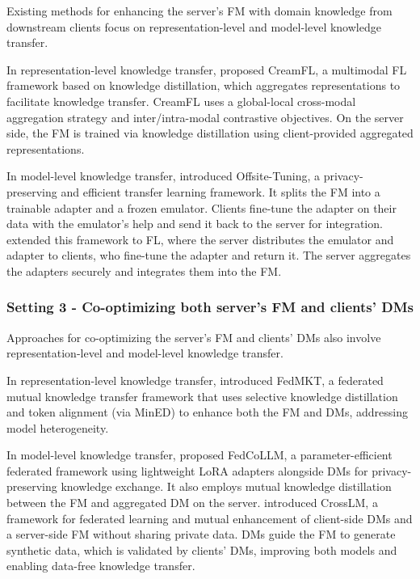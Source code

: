 Existing methods for enhancing the server's FM with domain knowledge from downstream clients focus on representation-level and model-level knowledge transfer. 

In representation-level knowledge transfer, \citet{yu2023multimodal} proposed CreamFL, a multimodal FL framework based on knowledge distillation, which aggregates representations to facilitate knowledge transfer. CreamFL uses a global-local cross-modal aggregation strategy and inter/intra-modal contrastive objectives. On the server side, the FM is trained via knowledge distillation using client-provided aggregated representations.

In model-level knowledge transfer, \citet{xiao2023offsite} introduced Offsite-Tuning, a privacy-preserving and efficient transfer learning framework. It splits the FM into a trainable adapter and a frozen emulator. Clients fine-tune the adapter on their data with the emulator's help and send it back to the server for integration. \citet{fan2023fate} extended this framework to FL, where the server distributes the emulator and adapter to clients, who fine-tune the adapter and return it. The server aggregates the adapters securely and integrates them into the FM.

\subsubsection{Setting 3 - Co-optimizing both server’s FM and clients’ DMs}

Approaches for co-optimizing the server’s FM and clients’ DMs also involve representation-level and model-level knowledge transfer. 

In representation-level knowledge transfer, \citet{fan-etal-2025-fedmkt} introduced FedMKT, a federated mutual knowledge transfer framework that uses selective knowledge distillation and token alignment (via MinED) to enhance both the FM and DMs, addressing model heterogeneity.

In model-level knowledge transfer, \citet{fan2024fedcollm} proposed FedCoLLM, a parameter-efficient federated framework using lightweight LoRA adapters alongside DMs for privacy-preserving knowledge exchange. It also employs mutual knowledge distillation between the FM and aggregated DM on the server. \citet{deng2023mutual} introduced CrossLM, a framework for federated learning and mutual enhancement of client-side DMs and a server-side FM without sharing private data. DMs guide the FM to generate synthetic data, which is validated by clients' DMs, improving both models and enabling data-free knowledge transfer.


